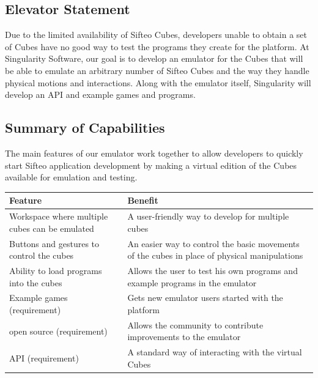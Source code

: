 \documentclass[12pt]{article}
\begin{document}
              \subsection{Elevator Statement}
              Due to the limited availability of Sifteo Cubes, developers unable to obtain a set of Cubes have no good way to test the programs they create for the platform. At Singularity Software, our goal is to develop an emulator for the Cubes that will be able to emulate an arbitrary number of Sifteo Cubes and the way they handle physical motions and interactions. Along with the emulator itself, Singularity will develop an \gls{API} and example games and programs.
\clearpage
              \subsection{Summary of Capabilities}
              The main features of our emulator work together to allow developers to quickly start Sifteo application development by making a virtual edition of the Cubes available for emulation and testing.
              \begin{table}[h]
                \begin{tabular}{p{3in} | p{3in}}
                  \textbf{Feature} & \textbf{Benefit} \\ \hline
                  Workspace where multiple cubes can be emulated
                            & A user-friendly way to develop for multiple cubes \\ \hline
                  Buttons and gestures to control the cubes
                            & An easier way to control the basic movements of the cubes in place of physical manipulations \\ \hline
                  Ability to load programs into the cubes
                            & Allows the user to test his own programs and example programs in the emulator \\ \hline
                  Example games (requirement)
                            & Gets new emulator\index{emulator} users started with the platform \\ \hline
                  \Gls{open source}\index{open source}  (requirement)
                            & Allows the community to contribute improvements to the emulator\index{emulator} \\ \hline
                  \gls{API}\index{API} (requirement)
                            & A standard way of interacting with the virtual Cubes
                \end{tabular}
              \end{table}
\end{document}
